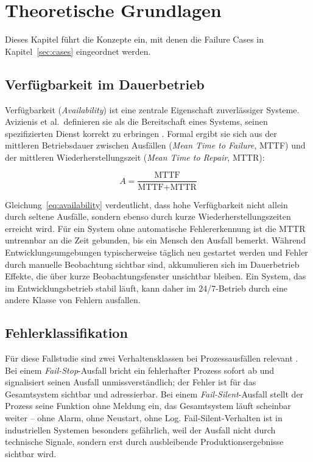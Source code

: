 
\section{Theoretische Grundlagen}
\label{sec:grundlagen}

Dieses Kapitel führt die Konzepte ein, mit denen die Failure Cases in
Kapitel~\ref{sec:cases} eingeordnet werden.

\subsection{Verfügbarkeit im Dauerbetrieb}
\label{sec:grundlagen-verfuegbarkeit}

Verfügbarkeit (\textit{Availability}) ist eine zentrale Eigenschaft zuverlässiger
Systeme. Avizienis et al.\ definieren sie als die Bereitschaft eines Systems, seinen
spezifizierten Dienst korrekt zu erbringen \cite{avizienis2004}. Formal ergibt sie sich
aus der mittleren Betriebsdauer zwischen Ausfällen (\textit{Mean Time to Failure}, MTTF)
und der mittleren Wiederherstellungszeit (\textit{Mean Time to Repair}, MTTR):

\begin{equation}
    A = \frac{\text{MTTF}}{\text{MTTF} + \text{MTTR}}
    \label{eq:availability}
\end{equation}

Gleichung~\ref{eq:availability} verdeutlicht, dass hohe Verfügbarkeit nicht allein durch
seltene Ausfälle, sondern ebenso durch kurze Wiederherstellungszeiten erreicht wird. Für
ein System ohne automatische Fehlererkennung ist die MTTR untrennbar an die Zeit
gebunden, bis ein Mensch den Ausfall bemerkt. Während Entwicklungsumgebungen typischerweise
täglich neu gestartet werden und Fehler durch manuelle Beobachtung sichtbar sind,
akkumulieren sich im Dauerbetrieb Effekte, die über kurze Beobachtungsfenster unsichtbar
bleiben. Ein System, das im Entwicklungsbetrieb stabil läuft, kann daher im 24/7-Betrieb
durch eine andere Klasse von Fehlern ausfallen.

\subsection{Fehlerklassifikation}
\label{sec:grundlagen-fehler}

Für diese Fallstudie sind zwei Verhaltensklassen bei Prozessausfällen relevant
\cite{cristian1991}. Bei einem
\textit{Fail-Stop}-Ausfall bricht ein fehlerhafter Prozess sofort ab und signalisiert
seinen Ausfall unmissverständlich; der Fehler ist für das Gesamtsystem sichtbar und
adressierbar. Bei einem \textit{Fail-Silent}-Ausfall stellt der Prozess seine Funktion
ohne Meldung ein, das Gesamtsystem läuft scheinbar weiter -- ohne Alarm, ohne Neustart,
ohne Log. Fail-Silent-Verhalten ist in industriellen Systemen besonders gefährlich, weil
der Ausfall nicht durch technische Signale, sondern erst durch ausbleibende
Produktionsergebnisse sichtbar wird.

